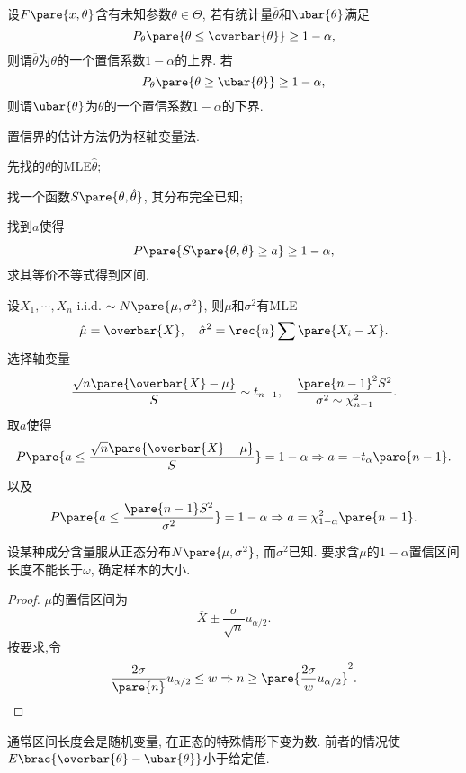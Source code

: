 \documentclass[../Statistics.tex]{subfiles}
\begin{document}
设$F\pare{x,\theta}$含有未知参数$\theta\in\Theta$, 若有统计量$\overbar{\theta}$和$\ubar{\theta}$满足
\[ P_\theta\pare{\theta \le \overbar{\theta}} \ge 1-\alpha, \]
则谓$\overbar{\theta}$为$\theta$的一个置信系数$1-\alpha$的上界. 若
\[ P_\theta\pare{\theta \ge \ubar{\theta}} \ge 1-\alpha, \]
则谓$\ubar{\theta}$为$\theta$的一个置信系数$1-\alpha$的下界.
\par
置信界的估计方法仍为枢轴变量法.
\begin{cenum}
    \item 先找的$\theta$的MLE$\hat\theta$;
    \item 找一个函数$S\pare{\theta,\hat\theta}$, 其分布完全已知;
    \item 找到$a$使得
    \[ P\pare{S\pare{\theta,\hat\theta} \ge a} \ge 1-\alpha, \]
    求其等价不等式得到区间.
\end{cenum}
\begin{sample}
    \begin{ex}
        设$X_1,\cdots,X_n$ i.i.d. $\sim N\pare{\mu,\sigma^2}$, 则$\mu$和$\sigma^2$有MLE
        \[ \hat\mu = \overbar{X},\quad \hat\sigma^2 = \rec{n}\sum \pare{X_i - X}. \]
        选择轴变量
        \[ \frac{\sqrt{n}\pare{\overbar{X} - \mu}}{S} \sim t_{n-1},\quad \frac{\pare{n-1}^2S^2}{\sigma^2 \sim \chi_{n-1}^2}. \]
        取$a$使得
        \[ P\pare{a\le \frac{\sqrt{n}\pare{\overbar{X} - \mu}}{S}} = 1-\alpha \Rightarrow a = -t_\alpha\pare{n-1}. \]
        以及
        \[ P\pare{a \le \frac{\pare{n-1}S^2}{\sigma^2}} = 1-\alpha \Rightarrow a = \chi_{1-\alpha}^2\pare{n-1}. \]
    \end{ex}
\end{sample}
\begin{sample}
    \begin{ex}
        设某种成分含量服从正态分布$N\pare{\mu,\sigma^2}$, 而$\sigma^2$已知. 要求含$\mu$的$1-\alpha$置信区间长度不能长于$\omega$, 确定样本的大小.
    \end{ex}
    \begin{proof}
        $\mu$的置信区间为
        \[ \overbar{X}\pm \frac{\sigma}{\sqrt{n}} u_{\alpha/2}. \]
        按要求,令
        \[ \frac{2\sigma}{\pare{n}} u_{\alpha/2} \le w \Rightarrow n \ge \pare{\frac{2\sigma}{w}u_{\alpha/2}}^2. \qedhere
         \]
    \end{proof}
\end{sample}
\begin{remark}
    通常区间长度会是随机变量, 在正态的特殊情形下变为数. 前者的情况使$E\brac{\overbar{\theta} - \ubar{\theta}}$小于给定值.
\end{remark}



\end{document}
